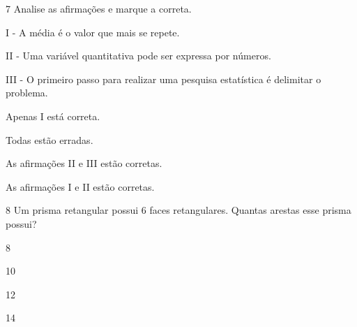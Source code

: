 




\num{7} Analise as afirmações e marque a correta.

I - A média é o valor que mais se repete.

II - Uma variável quantitativa pode ser expressa por números.

III - O primeiro passo para realizar uma pesquisa estatística é
delimitar o problema.
\item Apenas I está correta.
\item Todas estão erradas.
\item As afirmações II e III estão corretas.
\item As afirmações I e II estão corretas.






\num{8} Um prisma retangular possui 6 faces retangulares. Quantas arestas
esse prisma possui?
\item 8
\item 10
\item 12
\item 14

